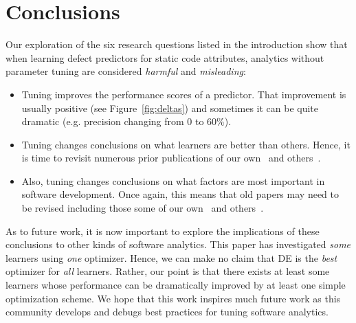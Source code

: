\documentclass[smallextended]{svjour3}
\newcommand{\bi}{\begin{itemize}[leftmargin=0.4cm]}
\newcommand{\ei}{\end{itemize}}
\newcommand{\fig}[1]{Figure~\ref{fig:#1}}
\begin{document}







\section{Conclusions}


Our exploration of the six research
questions listed in the introduction
show that when learning defect predictors for static code
attributes,   analytics without parameter tuning are considered {\em harmful} and {\em misleading}:
\bi
\item Tuning improves the performance scores of a predictor.
That improvement is usually positive (see \fig{deltas}) and sometimes
it can be quite   dramatic (e.g. precision changing from 0 to 60\%). \item 
Tuning changes conclusions on what learners are better than others.
Hence, it is time to revisit numerous prior publications of our own~\cite{me07b}
and others~\cite{lessmann2008benchmarking,hall11}.
\item
Also,
tuning changes conclusions on what factors are most important in software development.
Once again, this means that old papers may need to be revised including those
some of our own~\cite{me02k} and others~\cite{bell2013limited,rahman2013how,Moser:2008,zimmermann2007predicting,herzig2013predicting}. 
\ei
As to future work, it is now important
to explore the implications of these
conclusions to other kinds of software analytics.
 This paper has investigated  {\em some} learners using {\em one}  optimizer. Hence, we can make
no claim that DE is the {\em best} optimizer for {\em all} learners.
Rather, our point is that there exists at least some learners
whose performance can be dramatically improved by 
at least one simple optimization scheme.  We hope that this work inspires
much future work as this community develops and debugs best practices for tuning
software analytics.
\end{document}
